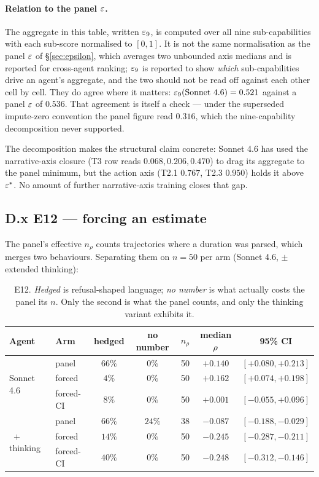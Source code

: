 \paragraph{Relation to the panel $\varepsilon$.} The aggregate in this table, written $\varepsilon_9$, is computed over all nine sub-capabilities with each sub-score normalised to $[0,1]$. It is not the same normalisation as the panel $\varepsilon$ of \S\ref{sec:epsilon}, which averages two unbounded axis medians and is reported for cross-agent ranking; $\varepsilon_9$ is reported to show \emph{which} sub-capabilities drive an agent's aggregate, and the two should not be read off against each other cell by cell. They do agree where it matters: $\varepsilon_9(\text{Sonnet 4.6}) = 0.521$ against a panel $\varepsilon$ of $0.536$. That agreement is itself a check --- under the superseded impute-zero convention the panel figure read $0.316$, which the nine-capability decomposition never supported.

The decomposition makes the structural claim concrete: Sonnet 4.6 has used the narrative-axis closure (T3 row reads $0.068, 0.206, 0.470$) to drag its aggregate to the panel minimum, but the action axis (T2.1 $0.767$, T2.3 $0.950$) holds it above $\varepsilon^{*}$. No amount of further narrative-axis training closes that gap.

\subsection*{D.x E12 --- forcing an estimate}

The panel's effective $n_\rho$ counts trajectories where a duration was
parsed, which merges two behaviours. Separating them on $n = 50$ per arm
(Sonnet 4.6, $\pm$ extended thinking):

\begin{table}[h]
\centering\small
\setlength{\tabcolsep}{4pt}
\caption{E12. \emph{Hedged} is refusal-shaped language; \emph{no number} is
what actually costs the panel its $n$. Only the second is what the panel
counts, and only the thinking variant exhibits it.}
\label{tab:e12}
\begin{tabular}{llccccc}
\toprule
Agent & Arm & hedged & no number & $n_\rho$ & median $\rho$ & 95\% CI \\
\midrule
\multirow{3}{*}{Sonnet 4.6}
 & panel     & $66\%$ & $0\%$ & 50 & $+0.140$ & $[+0.080, +0.213]$ \\
 & forced    & $4\%$  & $0\%$ & 50 & $+0.162$ & $[+0.074, +0.198]$ \\
 & forced-CI & $8\%$  & $0\%$ & 50 & $+0.001$ & $[-0.055, +0.096]$ \\
\midrule
\multirow{3}{*}{\ $+$ thinking}
 & panel     & $66\%$ & $24\%$ & 38 & $-0.087$ & $[-0.188, -0.029]$ \\
 & forced    & $14\%$ & $0\%$  & 50 & $-0.245$ & $[-0.287, -0.211]$ \\
 & forced-CI & $40\%$ & $0\%$  & 50 & $-0.248$ & $[-0.312, -0.146]$ \\
\bottomrule
\end{tabular}
\end{table}

